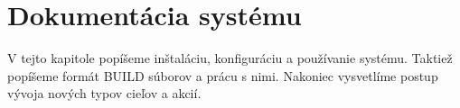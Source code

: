 \chapter{Dokument\'{a}cia syst\'{e}mu}
\label{ch:doc}

V tejto kapitole popíšeme inštaláciu, konfiguráciu a používanie systému. Taktiež
popíšeme formát BUILD súborov a prácu s nimi. Nakoniec vysvetlíme postup vývoja
nových typov cieľov a akcií.
